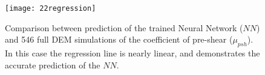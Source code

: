 \begin{figure}[!h] 
\centering 
\texttt{[image: 22regression]}
\caption[Comparison between prediction of the trained NN and full DEM
simulation]{Comparison between prediction of the trained Neural Network ($NN$)
and 546 full DEM simulations of the coefficient of pre-shear ($\mu_{psh}$). In
this case the regression line is nearly linear, and demonstrates the accurate
prediction of the $NN$.}
\label{fig:22regression} 
\end{figure}

